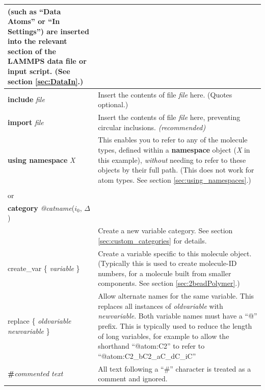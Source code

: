 \documentclass[11pt]{article}
\begin{document}
\begin{longtable}[h]{l|p{9cm}}
{(such as ``Data Atoms'' or ``In Settings'') are inserted
into the relevant section of the LAMMPS data file or input script.
(See section \ref{sec:DataIn}.)
}
\\
\hline
\textbf{include} \textit{file}
&
Insert the contents of file \textit{file} here. (Quotes optional.)
\\
\hline
\textbf{import} \textit{file}
&
Insert the contents of file \textit{file} here,
preventing circular inclusions.
\textit{(recommended)}
\\
\hline
\textbf{using namespace} \textit{X}
&
This enables you to refer to any of the molecule types,
defined within a \textbf{namespace} object (\textit{X} in this example),
\textit{without} needing to refer to these objects by their full path.
(This does not work for atom types.
See section \ref{sec:using_namespaces}.)
\\
\hline
\begin{tabular}[t]{l}
\textbf{category} \textit{\$catname}($i_0$, $\Delta$)
\\
or \\
\textbf{category} \textit{@catname}($i_0$, $\Delta$)
\\
\end{tabular}
&
Create a new variable category.
See section \ref{sec:custom_categories} for details.
\\
\hline
create\_var \{ \textit{variable} \} &
Create a variable specific to this molecule object. 
(Typically this is used to create molecule-ID numbers, 
for a molecule built from smaller components.
See section \ref{sec:2beadPolymer}.)
\\
\hline
replace \{ \textit{oldvariable} \textit{newvariable} \} &
Allow alternate names for the same variable.  This replaces all instances of \textit{oldvariable} with \textit{newvariable}.  Both variable names must have a ``@'' prefix.  This is typically used to reduce the length of long variables, for example to allow the shorthand ``@atom:C2'' to refer to ``@atom:C2\_bC2\_aC\_dC\_iC''
\\
\hline
 \textbf{\#}\textit{commented text} & 
All text following a ``\#'' character is treated as a comment and ignored.
\end{longtable}
\end{document}
